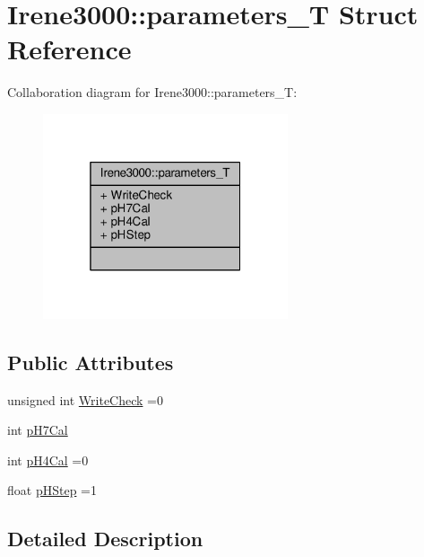 \hypertarget{struct_irene3000_1_1parameters___t}{}\section{Irene3000\+:\+:parameters\+\_\+T Struct Reference}
\label{struct_irene3000_1_1parameters___t}


Collaboration diagram for Irene3000\+:\+:parameters\+\_\+T\+:\nopagebreak
\begin{figure}[H]
\begin{center}
\leavevmode
\includegraphics[width=205pt]{d5/df5/struct_irene3000_1_1parameters___t__coll__graph}
\end{center}
\end{figure}
\subsection*{Public Attributes}
\begin{DoxyCompactItemize}
\item 
unsigned int \hyperlink{struct_irene3000_1_1parameters___t_a56f1f14d33a69300d580eda2dc52cecd}{Write\+Check} =0
\item 
int \hyperlink{struct_irene3000_1_1parameters___t_a21265466a570d84bff914f26d2f7a03e}{p\+H7\+Cal}
\item 
int \hyperlink{struct_irene3000_1_1parameters___t_a1144de6fb54eb3e1dd2a3d8c2afc97dc}{p\+H4\+Cal} =0
\item 
float \hyperlink{struct_irene3000_1_1parameters___t_a61cfcc2539d5f630e9071f3753aba9fe}{p\+H\+Step} =1
\end{DoxyCompactItemize}


\subsection{Detailed Description}


